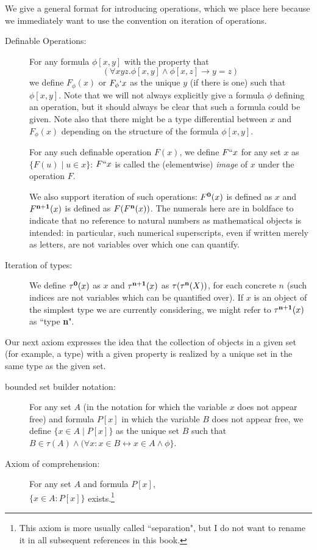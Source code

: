 \documentclass[12pt]{book}
\begin{document}
We give a general format for introducing operations, which we place here because we immediately want to use the convention on iteration of operations.

\begin{description}

\item[Definable Operations:] For any formula $\phi[x,y]$ with the
property that $$(\forall xyz.\phi[x,y] \wedge \phi[x,z] \rightarrow
y=z)$$ we define $F_{\phi}(x)$ or $F_{\phi}`x$ as the unique $y$ (if
there is one) such that $\phi[x,y]$.  Note that we will not always
explicitly give a formula $\phi$ defining an operation, but it should
always be clear that such a formula could be given.  Note also that
there might be a type differential between $x$ and $F_{\phi}(x)$
depending on the structure of the formula $\phi[x,y]$.

For any such definable operation $F(x)$, we define $F``x$ for any set
$x$ as $\{F(u)\mid u \in x\}$: $F``x$ is called the (elementwise) {\em
image\/} of $x$ under the operation $F$.

We also support iteration of such operations:  $F^{\bf 0}(x)$ is defined as
$x$ and $F^{\bf n+1}(x)$ is defined as $F(F^{\bf n}(x))$.   The numerals here are in boldface to indicate that no reference to natural numbers as mathematical objects is intended:  in particular, such numerical superscripts, even if written merely as letters, are not variables over which one can quantify.



\item[Iteration of types:]  We define $\tau^{\bf 0}(x)$ as $x$ and $\tau^{\bf n+1}(x)$ as $\tau(\tau^{\bf n}(X))$, for each concrete $n$ (such indices are not variables which can be quantified over).  If $x$ is an object of the simplest type we are currently considering, we might refer to $\tau^{\bf n+1}(x)$ as ``type {\bf n}".

\end{description}

Our next axiom expresses the idea that the collection of objects in a given set (for example, a type) with a given property is realized by a unique set in the same type as the given set.

\begin{description}

\item[bounded set builder notation:]  For any set $A$ (in the notation for which the variable $x$ does not appear free) and formula $P[x]$ in which the variable $B$ does not appear free, we define $\{x \in A\mid P[x]\}$ as the unique set $B$ such that
$B \in \tau(A) \wedge (\forall x:x \in B \leftrightarrow x \in A \wedge \phi\}$.

\item[Axiom of comprehension:] 

For any set $A$ and formula $P[x]$, \\ $\{x \in A:P[x]\}$ exists.\footnote{This axiom is more usually called ``separation", but I do not want to rename it in all subsequent references in this book.}

\end{description}
\end{document}
